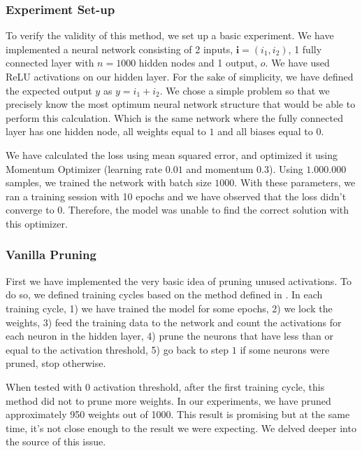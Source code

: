 \subsubsection{Experiment Set-up}
To verify the validity of this method, we set up a basic experiment. We have implemented a neural network consisting of 2 inputs, $\mathbf{i} = (i_1, i_2)$, 1 fully connected layer with $n = 1000$ hidden nodes and 1 output, $o$. We have used ReLU \cite{nair2010rectified} activations on our hidden layer. For the sake of simplicity, we have defined the expected output $y$ as $y = i_1 + i_2$. We chose a simple problem so that we precisely know the most optimum neural network structure that would be able to perform this calculation. Which is the same network where the fully connected layer has one hidden node, all weights equal to $1$ and all biases equal to $0$.

We have calculated the loss using mean squared error, and optimized it using Momentum Optimizer (learning rate $0.01$ and momentum $0.3$). Using $1.000.000$ samples, we trained the network with batch size $1000$. With these parameters, we ran a training session with 10 epochs and we have observed that the loss didn't converge to 0. Therefore, the model was unable to find the correct solution with this optimizer. 
\subsubsection{Vanilla Pruning}
First we have implemented the very basic idea of pruning unused activations. To do so, we defined training cycles based on the method defined in \cite{Hu:2016aa}. In each training cycle, 1) we have trained the model for some epochs, 2) we lock the weights, 3) feed the training data to the network and count the activations for each neuron in the hidden layer, 4) prune the neurons that have less than or equal to the activation threshold, 5) go back to step $1$ if some neurons were pruned, stop otherwise.

When tested with $0$ activation threshold, after the first training cycle, this method did not to prune more weights. In our experiments, we have pruned approximately 950 weights out of 1000. This result is promising but at the same time, it's not close enough to the result we were expecting. We delved deeper into the source of this issue.


